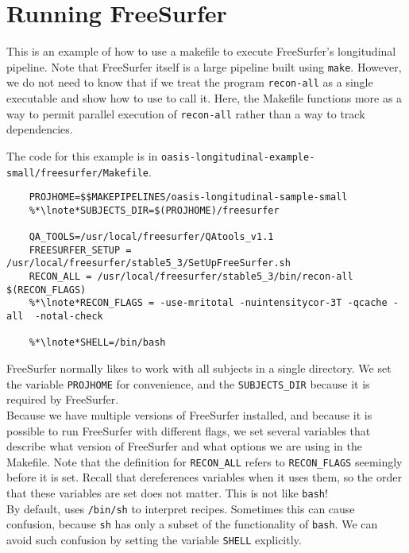 \chapter{Running FreeSurfer}
\def\sectionautorefname{Running Freesurfer}
\label{chap:freesurfer}

This is an example of how to use a makefile to execute FreeSurfer's longitudinal pipeline. Note that FreeSurfer itself is a large pipeline built using \texttt{make}. However, we do not need to know that if we treat the program \texttt{recon-all} as a single executable and show how to use \maken{} to call it. Here, the Makefile functions more as a way to permit parallel execution of \texttt{recon-all} rather than a way to track dependencies. 

The code for this example is in \texttt{oasis-longitudinal-example-small/freesurfer/Makefile}.

\setcounter{codehighlight}{0} %
\begin{lstlisting}
	PROJHOME=$$MAKEPIPELINES/oasis-longitudinal-sample-small
	%*\lnote*SUBJECTS_DIR=$(PROJHOME)/freesurfer

	QA_TOOLS=/usr/local/freesurfer/QAtools_v1.1
	FREESURFER_SETUP = /usr/local/freesurfer/stable5_3/SetUpFreeSurfer.sh
	RECON_ALL = /usr/local/freesurfer/stable5_3/bin/recon-all $(RECON_FLAGS)	
	%*\lnote*RECON_FLAGS = -use-mritotal -nuintensitycor-3T -qcache -all  -notal-check

	%*\lnote*SHELL=/bin/bash
\end{lstlisting}

FreeSurfer normally likes to work with all subjects in a single directory. We set the \maken{} variable \texttt{PROJHOME} for convenience, and the \texttt{SUBJECTS_DIR} because it is required by FreeSurfer. \\
\indent{}Because we have multiple versions of FreeSurfer installed, and because it is possible to run FreeSurfer with different flags, we set several variables that describe what version of FreeSurfer and what options we are using in the Makefile. Note that the definition for \texttt{RECON_ALL} refers to \texttt{RECON_FLAGS} seemingly before it is set. Recall that \maken{} dereferences variables when it uses them, so the order that these variables are set does not matter. This is not like \texttt{bash}!\\
\indent{}By default, \maken{} uses \texttt{/bin/sh} to interpret recipes. Sometimes this can cause confusion, because \texttt{sh} has only a subset of the functionality of \texttt{bash}. We can avoid such confusion by setting the \maken{} variable \texttt{SHELL} explicitly.


